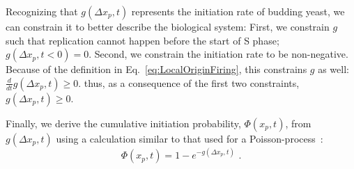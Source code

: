 		Recognizing that $g(\Delta x_p,t)$ represents the initiation rate of budding yeast, we can constrain it to better describe the biological system:
		First, we constrain $g$ such that replication cannot happen before the start of S phase; $g(\Delta x_p,t<0)=0$.
		Second, we constrain the initiation rate to be non-negative. Because of the definition in Eq.~\ref{eq:LocalOriginFiring}, this constrains $g$ as well: $\frac{d}{dt}g(\Delta x_p,t)\geq 0$.
		thus, as a consequence of the first two constraints, $g(\Delta x_p,t)\geq 0$.
		
		Finally, we derive the cumulative initiation probability, $\Phi(x_p,t)$, from $g(\Delta x_p,t)$ using a calculation similar to that used for a Poisson-process~\cite{Spikes}:
		\begin{equation} \label{eq:PhiFromG}
			\Phi\left( x_p,t\right) = 1 - e^{-g\left(\Delta x_p,t\right)} \text{ .}
		\end{equation}

